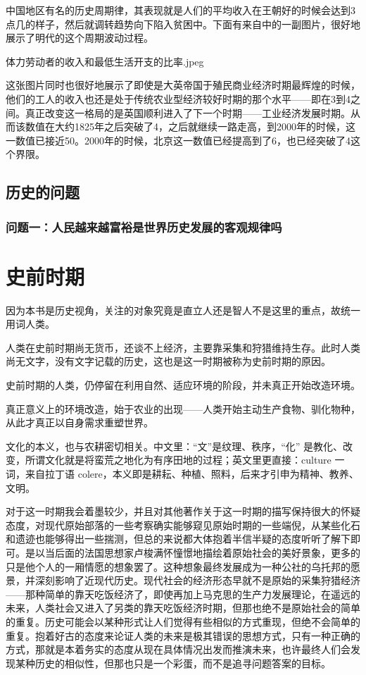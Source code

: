 \documentclass[12pt,oneside]{book}
\begin{document}
中国地区有名的历史周期律，其表现就是人们的平均收入在王朝好的时候会达到3点几的样子，然后就调转趋势向下陷入贫困中。下面有来自\cite{全球经济史}中的一副图片，很好地展示了明代的这个周期波动过程。

\begin{linefig}{体力劳动者的收入和最低生活开支的比率.jpeg}
\caption{体力劳动者的收入和最低生活开支的比率}
\label{fig:体力劳动者的收入和最低生活开支的比率}
\end{linefig}

这张图片同时也很好地展示了即使是大英帝国于殖民商业经济时期最辉煌的时候，他们的工人的收入也还是处于传统农业型经济较好时期的那个水平——即在3到4之间。真正改变这一格局的是英国顺利进入了下一个时期——工业经济发展时期。从而该数值在大约1825年之后突破了4，之后就继续一路走高，到2000年的时候，这一数值已接近50。2000年的时候，北京这一数值已经提高到了6，也已经突破了4这个界限。


\chapter{历史的问题}
\section{问题一：人民越来越富裕是世界历史发展的客观规律吗}


\part{史前时期}
因为本书是历史视角，关注的对象究竟是直立人还是智人不是这里的重点，故统一用词人类。

人类在史前时期尚无货币，还谈不上经济，主要靠采集和狩猎维持生存。此时人类尚无文字，没有文字记载的历史，这也是这一时期被称为史前时期的原因。

史前时期的人类，仍停留在利用自然、适应环境的阶段，并未真正开始改造环境。

真正意义上的环境改造，始于农业的出现——人类开始主动生产食物、驯化物种，从此才真正以自身需求重塑世界。

文化的本义，也与农耕密切相关。中文里：“文”是纹理、秩序，“化” 是教化、改变，所谓文化就是将蛮荒之地化为有序田地的过程；英文里更直接：culture 一词，来自拉丁语 colere，本义即是耕耘、种植、照料，后来才引申为精神、教养、文明。

对于这一时期我会着墨较少，并且对其他著作关于这一时期的描写保持很大的怀疑态度，对现代原始部落的一些考察确实能够窥见原始时期的一些端倪，从某些化石和遗迹也能够得出一些揣测，但总的来说都大体抱着半信半疑的态度听听了解下即可。是以当后面的法国思想家卢梭满怀憧憬地描绘着原始社会的美好景象，更多的只是他个人的一厢情愿的想象罢了。这种想象最终发展成为一种公社的乌托邦的愿景，并深刻影响了近现代历史。现代社会的经济形态早就不是原始的采集狩猎经济——那种简单的靠天吃饭经济了，即使再加上马克思的生产力发展理论，在遥远的未来，人类社会又进入了另类的靠天吃饭经济时期，但那也绝不是原始社会的简单的重复。历史可能会以某种形式让人们觉得有些相似的方式重现，但绝不会简单的重复。抱着好古的态度来论证人类的未来是极其错误的思想方式，只有一种正确的方式，那就是本着务实的态度从现在具体情况出发而推演未来，也许最终人们会发现某种历史的相似性，但那也只是一个彩蛋，而不是追寻问题答案的目标。
\end{document}
